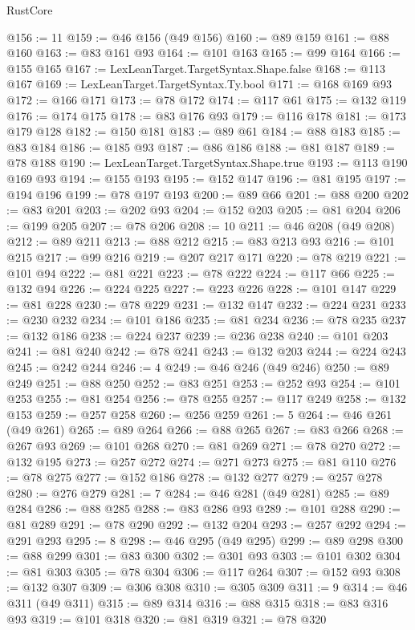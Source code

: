 \begin{lexlean}{RustCore}
\begin{coremodule}
@156 := 11
@159 := @46 @156 (@49 @156)
@160 := @89 @159
@161 := @88 @160
@163 := @83 @161 @93
@164 := @101 @163
@165 := @99 @164
@166 := @155 @165
@167 := LexLeanTarget.TargetSyntax.Shape.false
@168 := @113 @167
@169 := LexLeanTarget.TargetSyntax.Ty.bool
@171 := @168 @169 @93
@172 := @166 @171
@173 := @78 @172
@174 := @117 @61
@175 := @132 @119
@176 := @174 @175
@178 := @83 @176 @93
@179 := @116 @178
@181 := @173 @179 @128
@182 := @150 @181
@183 := @89 @61
@184 := @88 @183
@185 := @83 @184
@186 := @185 @93
@187 := @86 @186
@188 := @81 @187
@189 := @78 @188
@190 := LexLeanTarget.TargetSyntax.Shape.true
@193 := @113 @190 @169 @93
@194 := @155 @193
@195 := @152 @147
@196 := @81 @195
@197 := @194 @196
@199 := @78 @197 @193
@200 := @89 @66
@201 := @88 @200
@202 := @83 @201
@203 := @202 @93
@204 := @152 @203
@205 := @81 @204
@206 := @199 @205
@207 := @78 @206
@208 := 10
@211 := @46 @208 (@49 @208)
@212 := @89 @211
@213 := @88 @212
@215 := @83 @213 @93
@216 := @101 @215
@217 := @99 @216
@219 := @207 @217 @171
@220 := @78 @219
@221 := @101 @94
@222 := @81 @221
@223 := @78 @222
@224 := @117 @66
@225 := @132 @94
@226 := @224 @225
@227 := @223 @226
@228 := @101 @147
@229 := @81 @228
@230 := @78 @229
@231 := @132 @147
@232 := @224 @231
@233 := @230 @232
@234 := @101 @186
@235 := @81 @234
@236 := @78 @235
@237 := @132 @186
@238 := @224 @237
@239 := @236 @238
@240 := @101 @203
@241 := @81 @240
@242 := @78 @241
@243 := @132 @203
@244 := @224 @243
@245 := @242 @244
@246 := 4
@249 := @46 @246 (@49 @246)
@250 := @89 @249
@251 := @88 @250
@252 := @83 @251
@253 := @252 @93
@254 := @101 @253
@255 := @81 @254
@256 := @78 @255
@257 := @117 @249
@258 := @132 @153
@259 := @257 @258
@260 := @256 @259
@261 := 5
@264 := @46 @261 (@49 @261)
@265 := @89 @264
@266 := @88 @265
@267 := @83 @266
@268 := @267 @93
@269 := @101 @268
@270 := @81 @269
@271 := @78 @270
@272 := @132 @195
@273 := @257 @272
@274 := @271 @273
@275 := @81 @110
@276 := @78 @275
@277 := @152 @186
@278 := @132 @277
@279 := @257 @278
@280 := @276 @279
@281 := 7
@284 := @46 @281 (@49 @281)
@285 := @89 @284
@286 := @88 @285
@288 := @83 @286 @93
@289 := @101 @288
@290 := @81 @289
@291 := @78 @290
@292 := @132 @204
@293 := @257 @292
@294 := @291 @293
@295 := 8
@298 := @46 @295 (@49 @295)
@299 := @89 @298
@300 := @88 @299
@301 := @83 @300
@302 := @301 @93
@303 := @101 @302
@304 := @81 @303
@305 := @78 @304
@306 := @117 @264
@307 := @152 @93
@308 := @132 @307
@309 := @306 @308
@310 := @305 @309
@311 := 9
@314 := @46 @311 (@49 @311)
@315 := @89 @314
@316 := @88 @315
@318 := @83 @316 @93
@319 := @101 @318
@320 := @81 @319
@321 := @78 @320

\end{coremodule}
\end{lexlean}
